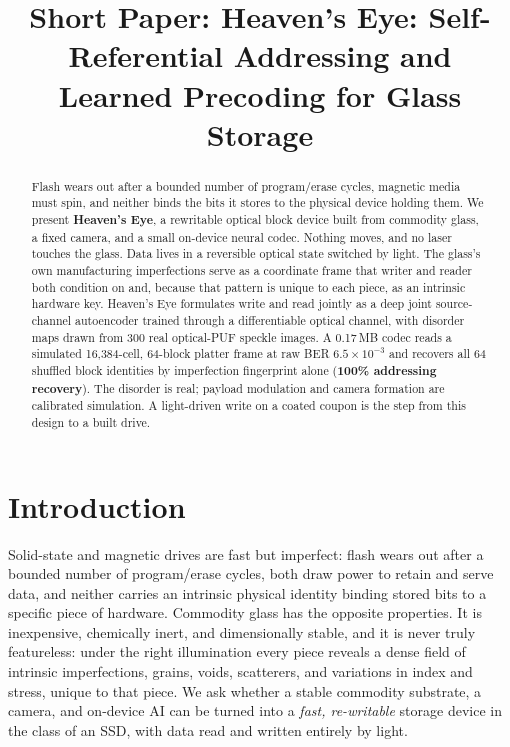 \documentclass[letterpaper,twocolumn,10pt]{article}
\title{Short Paper: Heaven's Eye: Self-Referential Addressing and Learned
Precoding for Glass Storage}
\author{}
\date{}
\begin{document}
\maketitle

\begin{abstract}
Flash wears out after a bounded number of program/erase cycles, magnetic media
must spin, and neither binds the bits it stores to the physical device holding
them.  We present \textbf{Heaven's Eye}, a rewritable optical block device built
from commodity glass, a fixed camera, and a small on-device neural codec.
Nothing moves, and no laser touches the glass.  Data lives in a reversible
optical state switched by light.  The glass's own manufacturing imperfections
serve as a coordinate frame that writer and reader both condition on and,
because that pattern is unique to each piece, as an intrinsic hardware key.  Heaven's Eye formulates write and read jointly as a deep joint
source-channel autoencoder trained through a differentiable optical channel,
with disorder maps drawn from 300 real optical-PUF speckle images.  A
0.17\,MB codec reads a simulated 16{,}384-cell, 64-block platter frame at raw
BER $6.5\times10^{-3}$ and recovers all 64 shuffled block identities by
imperfection fingerprint alone (\textbf{100\% addressing recovery}).  The
disorder is real; payload modulation and camera formation are calibrated
simulation.  A light-driven write on a coated coupon is the step from this
design to a built drive.
\end{abstract}

\section{Introduction}
Solid-state and magnetic drives are fast but imperfect: flash wears out after a bounded
number of program/erase cycles, both draw power to retain and serve data, and neither
carries an intrinsic physical identity binding stored bits to a specific piece of hardware.
Commodity glass has the opposite properties.  It is inexpensive, chemically inert,
and dimensionally stable, and it is never truly featureless: under the right
illumination every piece reveals a dense field of intrinsic imperfections, grains,
voids, scatterers, and variations in index and stress, unique to that piece. We ask whether a stable
commodity substrate, a camera, and on-device AI can be turned into a \emph{fast,
re-writable} storage device in the class of an SSD, with data read and written entirely by
light.
\end{document}
